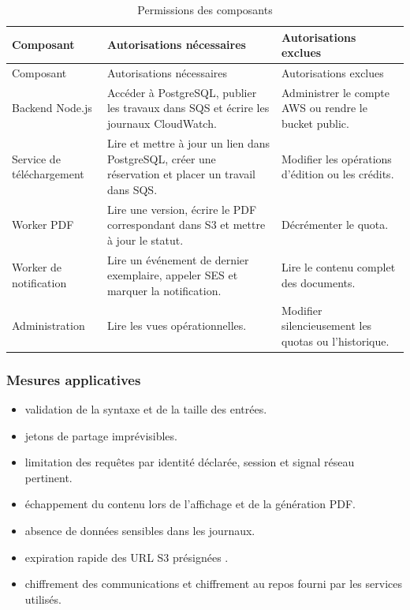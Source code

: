 \begingroup\small\setlength{\tabcolsep}{3pt}\renewcommand{\arraystretch}{1.25}
\begin{longtable}{|P{0.22\textwidth}|P{0.36\textwidth}|P{0.35\textwidth}|}
\caption{Permissions des composants}\\
\hline
Composant & Autorisations nécessaires & Autorisations exclues \\ \hline
\endfirsthead
\hline
Composant & Autorisations nécessaires & Autorisations exclues \\ \hline
\endhead
\endfoot

Backend Node.js & Accéder à PostgreSQL, publier les travaux dans SQS et écrire les journaux CloudWatch. & Administrer le compte AWS ou rendre le bucket public. \\ \hline

Service de téléchargement & Lire et mettre à jour un lien dans PostgreSQL, créer une réservation et placer un travail dans SQS. & Modifier les opérations d'édition ou les crédits. \\ \hline

Worker PDF & Lire une version, écrire le PDF correspondant dans S3 et mettre à jour le statut. & Décrémenter le quota. \\ \hline

Worker de notification & Lire un événement de dernier exemplaire, appeler SES et marquer la notification. & Lire le contenu complet des documents. \\ \hline

Administration & Lire les vues opérationnelles. & Modifier silencieusement les quotas ou l'historique. \\ \hline

\end{longtable}\endgroup

\subsubsection{Mesures applicatives}

\begin{itemize}
\item validation de la syntaxe et de la taille des entrées.
\item jetons de partage imprévisibles.
\item limitation des requêtes par identité déclarée, session et signal réseau pertinent.
\item échappement du contenu lors de l'affichage et de la génération PDF.
\item absence de données sensibles dans les journaux.
\item expiration rapide des URL S3 présignées \cite{awspresigned}.
\item chiffrement des communications et chiffrement au repos fourni par les services utilisés.
\end{itemize}

